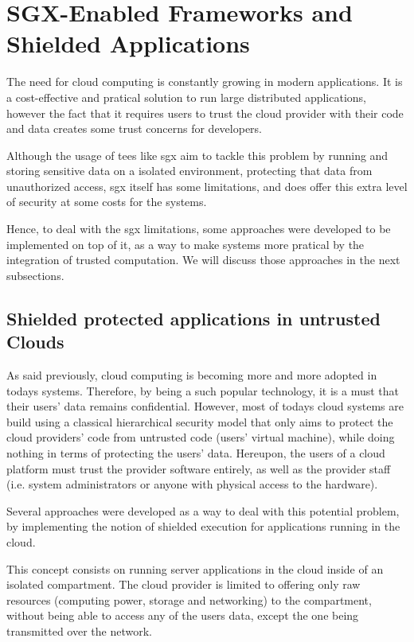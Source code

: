 

\section{SGX-Enabled Frameworks and Shielded Applications}

The need for cloud computing is constantly growing in modern applications. 
It is a cost-effective and pratical solution to run large distributed applications, however the fact that it requires users to trust the cloud provider with their code and data creates some trust concerns for developers.

Although the usage of \gls{tee}s like \gls{sgx} aim to tackle this problem by running and storing sensitive data on a isolated environment, protecting that data from unauthorized access, \gls{sgx} itself has some limitations, and does offer this extra level of security at some costs for the systems. 

Hence, to deal with the \gls{sgx} limitations, some approaches were developed to be implemented on top of it, as a way to make systems more pratical by the integration of trusted computation. 
We will discuss those approaches in the next subsections.



\subsection{Shielded protected applications in untrusted Clouds}

As said previously, cloud computing is becoming more and more adopted in todays systems. 
Therefore, by being a such popular technology, it is a must that their users' data remains confidential. 
However, most of todays cloud systems are build using a classical hierarchical security model that only aims to protect the cloud providers' code from untrusted code (users' virtual machine), while doing nothing in terms of protecting the users' data. 
Hereupon, the users of a cloud platform must trust the provider software entirely, as well as the provider staff (i.e. system administrators or anyone with physical access to the hardware).

Several approaches were developed as a way to deal with this potential problem, by implementing the notion of shielded execution for applications running in the cloud. 

This concept consists on running server applications in the cloud inside of an isolated compartment. The cloud provider is limited to offering only raw resources (computing power, storage and networking) to the compartment, without being able to access any of the users data, except the one being transmitted over the network. 


